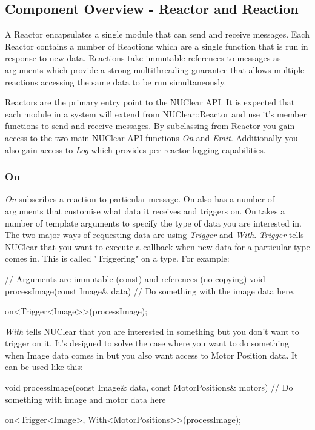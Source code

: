 \documentclass[english,12pt]{scrartcl}
\begin{document}
		\subsection{Component Overview - Reactor and Reaction}
			A Reactor encapsulates a single module that can send and receive messages.
			Each Reactor contains a number of Reactions which are a single function that is run in response to new data. 
			Reactions take immutable references to messages as arguments which provide a strong multithreading guarantee that allows multiple reactions accessing the same data to be run simultaneously.
			
			Reactors are the primary entry point to the NUClear API. 
			It is expected that each module in a system will extend from NUClear::Reactor and use it's member functions to send and receive messages.
			By subclassing from Reactor you gain access to the two main NUClear API functions \emph{On} and \emph{Emit}. 
			Additionally you also gain access to \emph{Log} which provides per-reactor logging capabilities.
	
			\subsubsection{On}
				\emph{On} subscribes a reaction to particular message. 
				On also has a number of arguments that customise what data it receives and triggers on.
				On takes a number of template arguments to specify the type of data you are interested in. 
				The two major ways of requesting data are using \emph{Trigger} and \emph{With}.
				\emph{Trigger} tells NUClear that you want to execute a callback when new data for a particular type comes in.
				This is called "Triggering" on a type. 
				For example:
				
				\begin{cppcode}
					// Arguments are immutable (const) and references (no copying)
					void processImage(const Image& data) {
					    // Do something with the image data here.
					}
				
					on<Trigger<Image>>(processImage);
				\end{cppcode}
				
				\emph{With} tells NUClear that you are interested in something but you don't want to trigger on it. 
				It's designed to solve the case where you want to do something when Image data comes in but you also want access to Motor Position data.
				It can be used like this:
				
				\begin{cppcode}
					void processImage(const Image& data, const MotorPositions& motors) {
					    // Do something with image and motor data here
					}
					
					on<Trigger<Image>, With<MotorPositions>>(processImage);
				\end{cppcode}
				
\end{document}
